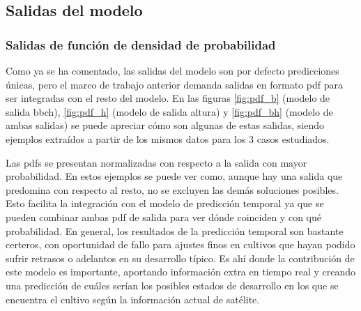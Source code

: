 \subsection{Salidas del modelo}
\subsubsection{Salidas de función de densidad de probabilidad}
Como ya se ha comentado, las salidas del modelo son por defecto predicciones únicas, pero el marco de trabajo anterior demanda salidas en formato \gls{pdf} para ser integradas con el resto del modelo. En las figuras \ref{fig:pdf_b} (modelo de salida \gls{bbch}), \ref{fig:pdf_h} (modelo de salida altura) y \ref{fig:pdf_bh} (modelo de ambas salidas) se puede apreciar cómo son algunas de estas salidas, siendo ejemplos extraídos a partir de los mismos datos para los 3 casos estudiados. 
\\
\par Las \gls{pdf}s se presentan normalizadas con respecto a la salida con mayor probabilidad. En estos ejemplos se puede ver como, aunque hay una salida que predomina con respecto al resto, no se excluyen las demás soluciones posibles. Esto facilita la integración con el modelo de predicción temporal ya que se pueden combinar ambas \gls{pdf} de salida para ver dónde coinciden y con qué probabilidad. En general, los resultados de la predicción temporal son bastante certeros, con oportunidad de fallo para ajustes finos en cultivos que hayan podido sufrir retrasos o adelantos en su desarrollo típico. Es ahí donde la contribución de este modelo es importante, aportando información extra en tiempo real y creando una predicción de cuáles serían los posibles estados de desarrollo en los que se encuentra el cultivo según la información actual de satélite. 
\\
